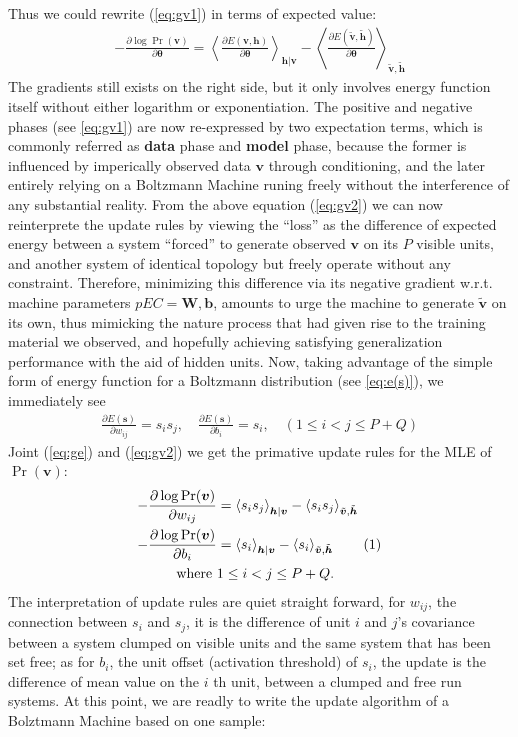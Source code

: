 \documentclass[11pt]{article}
\newcommand{\mean}[2]{\left\langle{#1}\right\rangle_{#2}}
\newcommand\numberthis{\addtocounter{equation}{1}\tag{\theequation}}
\newcommand{\vb}{\boldsymbol{b}}
\newcommand{\vh}{\boldsymbol{h}}
\newcommand{\vv}{\boldsymbol{v}}
\newcommand{\vs}{\boldsymbol{s}}
\newcommand{\mw}{\boldsymbol{W}}
\newcommand{\vht}{\tilde{\vh}}
\newcommand{\vvt}{\tilde{\vv}}
\newcommand{\pEC}{\boldsymbol{\theta}}
\newcommand{\PDV}[2]{\frac{\partial #1}{\partial #2}}
\begin{document}
Thus we could rewrite ({\ref{eq:gv1}) in terms of expected value:
\begin{align} \label{eq:gv2}
  -\PDV{\log{\Pr(\vv)}}{\pEC} = \mean{\PDV{E(\vv, \vh)}{\pEC}}{\vh|\vv} - \mean{\PDV{E(\vvt, \vht)}{\pEC}}{\vvt, \vht}
\end{align}
The gradients still exists on the right side, but it only involves energy function itself without either logarithm or exponentiation. The positive and negative phases (see \ref{eq:gv1}) are now re-expressed by two expectation terms, which is commonly referred as \textbf{data} phase and \textbf{model} phase, because the former is influenced by imperically observed data $\vv$ through conditioning, and the later entirely relying on a Boltzmann Machine runing freely without the interference of any substantial reality. From the above equation (\ref{eq:gv2}) we can now reinterprete the update rules by viewing the ``loss'' as the difference of expected energy between a system ``forced'' to generate observed $\vv$ on its $P$ visible units, and another system of identical topology but freely operate without any constraint. Therefore, minimizing this difference via its negative gradient w.r.t. machine parameters $pEC={\mw, \vb}$, amounts to urge the machine to generate $\vvt$ on its own, thus mimicking the nature process that had given rise to the training material we observed, and hopefully achieving satisfying generalization performance with the aid of hidden units.
Now, taking advantage of the simple form of energy function for a Boltzmann distribution (see \ref{eq:e(s)}), we immediately see
\begin{align} \label{eq:ge}
  \PDV{E(\vs)}{w_{ij}} = s_i s_j,  \quad \PDV{E(\vs)}{b_i} = s_i, \quad  (1 \le i < j \le P+Q)
\end{align}
Joint (\ref{eq:ge}) and (\ref{eq:gv2}) we get the primative update rules for the MLE of $\Pr(\vv)$:
\begin{align*} \label{eq:gv3}
  -\PDV{\log{\Pr(\vv)}}{w_{ij}} &= \mean{s_i s_j}{\vh|\vv} - \mean{s_i s_j}{\vvt, \vht} \\
  -\PDV{\log{\Pr(\vv)}}{b_i}    &= \mean{s_i}{\vh|\vv} - \mean{s_i}{\vvt, \vht} \numberthis \\
  \textrm{where }               & 1 \le i < j \le P+Q.
\end{align*}
The interpretation of update rules are quiet straight forward, for $w_{ij}$, the connection between $s_i$ and $s_j$, it is the difference of unit $i$ and $j$'s covariance between a system clumped on visible units and the same system that has been set free; as for $b_i$, the unit offset (activation threshold) of $s_i$, the update is the difference of mean value on the $i$ th unit, between a clumped and free run systems. At this point, we are readly to write the update algorithm of a Bolztmann Machine based on one sample:
}
\end{document}
